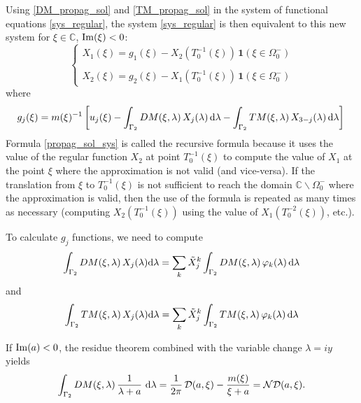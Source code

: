 Using \eqref{DM_propag_sol} and \eqref{TM_propag_sol} in the system of functional equations \eqref{sys_regular}, the system \eqref{sys_regular} is then equivalent to this new system for $\xi \in \mathbb{C}$, ${\rm Im}(\xi) <0$:
\begin{equation}
\label{propag_sol_sys}
\begin{cases}
X_1(\xi) = g_1(\xi) -  X_2(T_0^{-1}(\xi)) \, \mathbf{1}(\xi \in \Omega_0^-) \\
\\
X_2(\xi) = g_2(\xi) - X_1(T_0^{-1}(\xi)) \, \mathbf{1}(\xi \in \Omega_0^-) 
\end{cases}
\end{equation}
where
\begin{equation}
g_j(\xi) = m(\xi)^{-1} \left[ u_j(\xi) - \int_{\Gamma_2} DM(\xi,\lambda) \, X_j(\lambda) \, {\rm d} \lambda - \int_{\Gamma_2} TM(\xi,\lambda) \, X_{3-j}(\lambda) \, {\rm d} \lambda \right] \\
\end{equation}
Formula \eqref{propag_sol_sys} is called the recursive formula because it uses the value of the regular function $X_2$ at point $T_0^{-1}(\xi)$ to compute the value of $X_1$ at the point $\xi$ where the approximation is not valid (and vice-versa). If the translation from $\xi$ to $T_0^{-1}(\xi)$ is not sufficient to reach the domain $\mathbb{C} \backslash \Omega_0^-$ where the approximation is valid, then the use of the formula is repeated as many times as necessary (computing $X_2(T_0^{-1}(\xi))$ using the value of $X_1(T_0^{-2}(\xi))$, etc.).

To calculate $g_j$ functions, we need to compute
\begin{equation*}
\int_{\Gamma_2} DM(\xi,\lambda) \, X_j(\lambda) {\rm d} \lambda =\sum_k \tilde{X}_j^k \int_{\Gamma_2} DM(\xi,\lambda) \, \varphi_k(\lambda) \, {\rm d} \lambda 
\end{equation*}
and
\begin{equation*}
\int_{\Gamma_2} TM(\xi,\lambda) \, X_j(\lambda) {\rm d} \lambda = \sum_k \tilde{X}_j^k \int_{\Gamma_2} TM(\xi,\lambda) \, \varphi_k(\lambda) \, {\rm d} \lambda
\end{equation*}

If ${\rm Im}(a) < 0$, the residue theorem combined with the variable change $\lambda = iy$  yields
\begin{equation}
\int_{\Gamma_2} DM(\xi,\lambda) \,  \dfrac{1}{\lambda+a} \, \, {\rm d} \lambda =  \dfrac{1}{2\pi} \, \mathcal{D}(a,\xi) - \dfrac{m(\xi)}{\xi +a} = \mathcal{ND}(a,\xi). 
\end{equation}

